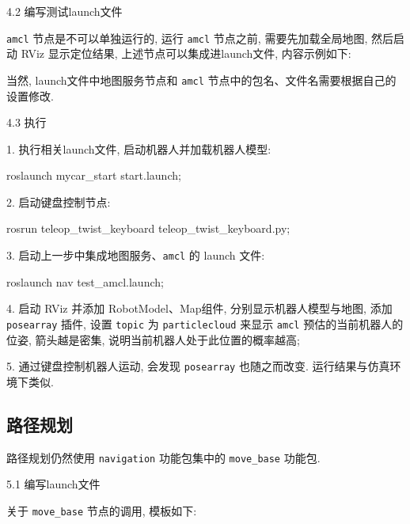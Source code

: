 \documentclass[openany, fontset=windowsold]{ctexbook}
\theoremstyle{kaiti}
\theoremstyle{normal}
\begin{document}
4.2 编写测试launch文件

\verb|amcl| 节点是不可以单独运行的, 运行 \verb|amcl| 节点之前, 需要先加载全局地图, 然后启动 RViz 显示定位结果, 上述节点可以集成进launch文件, 内容示例如下:


当然, launch文件中地图服务节点和 \verb|amcl| 节点中的包名、文件名需要根据自己的设置修改.

4.3 执行

1. 执行相关launch文件, 启动机器人并加载机器人模型: 

\begin{bash}
  roslaunch mycar_start start.launch; 
\end{bash}

2. 启动键盘控制节点: 

\begin{bash}
  rosrun teleop_twist_keyboard teleop_twist_keyboard.py; 
\end{bash}

3. 启动上一步中集成地图服务、\verb|amcl| 的 launch 文件: 

\begin{bash}
  roslaunch nav test_amcl.launch; 
\end{bash}

4. 启动 RViz 并添加 RobotModel、Map组件, 分别显示机器人模型与地图, 添加 \verb|posearray| 插件, 设置 \verb|topic| 为 \verb|particlecloud| 来显示 \verb|amcl| 预估的当前机器人的位姿, 箭头越是密集, 说明当前机器人处于此位置的概率越高; 

5. 通过键盘控制机器人运动, 会发现 \verb|posearray| 也随之而改变. 运行结果与仿真环境下类似.

\subsection{路径规划}

路径规划仍然使用 \verb|navigation| 功能包集中的 \verb|move_base| 功能包.

5.1 编写launch文件

关于 \verb|move_base| 节点的调用, 模板如下:
\end{document}
